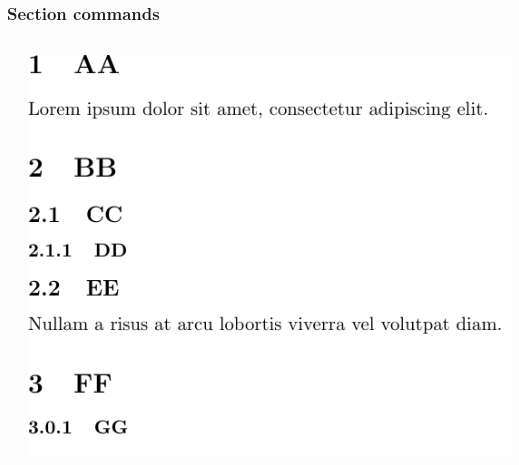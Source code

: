 \begin{frame}
    \frametitle{Section commands}

    \begin{columns}
        \begin{column}{0.5\textwidth}
        \end{column}
        \begin{column}{0.5\textwidth}
            \includegraphics[width=\linewidth,height=0.8\textheight,keepaspectratio]{assets/sectioncommands.pdf}
        \end{column}
    \end{columns}
\end{frame}

